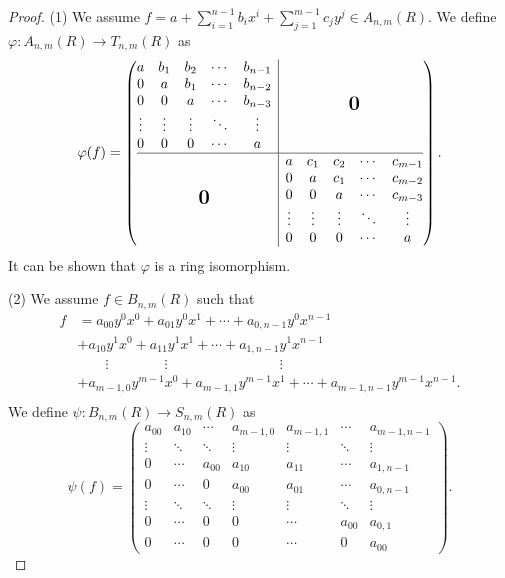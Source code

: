 \documentclass[12pt]{amsart}
\theoremstyle{definition}
\newcommand{\bigzero}{\mbox{\normalfont\Large\bfseries 0}}
\begin{document}
\begin{proof}
(1) We assume $f = a+ \sum_{i=1}^{n-1}b_ix^i + \sum_{j=1}^{m-1}c_jy^j \in A_{n,m}(R)$. We define $\varphi:  A_{n,m}(R) \to  T_{n,m}(R)$ as 
$$\varphi(f)=
\left(\begin{array}{@{}c|c@{}}
  \begin{matrix}
  a & b_1 & b_2 & \cdots & b_{n-1} \\
  0 & a & b_1 & \cdots & b_{n-2} \\
  0 & 0 & a & \cdots & b_{n-3} \\
  \vdots & \vdots & \vdots & \ddots & \vdots \\
  0 & 0 & 0 & \cdots & a
  \end{matrix}
  &\bigzero \\
\hline
  \bigzero &
  \begin{matrix}
  a & c_1 & c_2 & \cdots & c_{m-1} \\
  0 & a & c_1 & \cdots & c_{m-2} \\
  0 & 0 & a & \cdots & c_{m-3} \\
  \vdots & \vdots & \vdots & \ddots & \vdots \\
  0 & 0 & 0 & \cdots & a
  \end{matrix}
\end{array}\right). $$
It can be shown that $\varphi$ is a ring isomorphism.

(2) We assume $f \in B_{n,m}(R)$ such that 
\begin{align*}
    f &=  a_{00}y^0x^0 + a_{01}y^0x^1 + \cdots + a_{0,n-1}y^0x^{n-1}  \\
      &+  a_{10}y^1x^0 + a_{11}y^1x^1 + \cdots + a_{1,n-1}y^1x^{n-1}   \\
      & \qquad \vdots   \qquad \qquad \vdots  \qquad \qquad \qquad \qquad  \vdots   \\
      &+ a_{m-1,0}y^{m-1}x^0 + a_{m-1,1}y^{m-1}x^1 + \cdots + a_{m-1,n-1}y^{m-1}x^{n-1}.    \\
\end{align*}
We define $\psi :  B_{n,m}(R) \to  S_{n,m}(R)$ as 
$$\psi(f)=
 \begin{pmatrix}
   a_{00} & a_{10} & \cdots & a_{m-1,0} & a_{m-1,1} & \cdots & a_{m-1,n-1}\\
   \vdots  & \ddots & \ddots & \vdots & \vdots & \ddots & \vdots \\
   0 & \cdots & a_{00} & a_{10} & a_{11} & \cdots & a_{1,n-1} \\
   0 & \cdots & 0 & a_{00} & a_{01} & \cdots & a_{0,n-1} \\
   \vdots  & \ddots & \ddots & \vdots & \vdots & \ddots & \vdots \\
   0 & \cdots & 0 & 0  & \cdots & a_{00} & a_{0,1} \\
   0 & \cdots & 0 & 0  & \cdots & 0 & a_{00}
\end{pmatrix}.$$


\end{proof}
\end{document}

